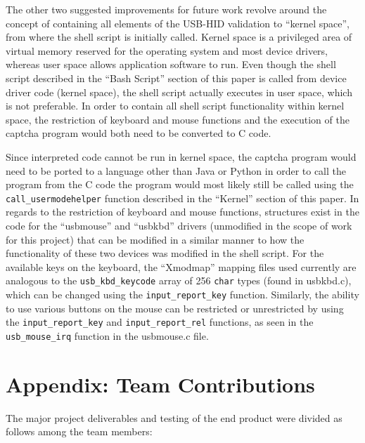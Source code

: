 \documentclass[pagenumbers]{ieee}
\begin{document}
The other two suggested improvements for future work revolve around the concept of containing all elements of the USB-HID validation to ``kernel space'', from where the shell script is initially called. Kernel space is a privileged area of virtual memory reserved for the operating system and most device drivers, whereas user space allows application software to run. Even though the shell script described in the ``Bash Script'' section of this paper is called from device driver code (kernel space), the shell script actually executes in user space, which is not preferable. In order to contain all shell script functionality within kernel space, the restriction of keyboard and mouse functions and the execution of the captcha program would both need to be converted to C code. 

Since interpreted code cannot be run in kernel space, the captcha program would need to be ported to a language other than Java or Python in order to call the program from the C code \textemdash the program would most likely still be called using the \texttt{call\_usermodehelper} function described in the ``Kernel'' section of this paper. In regards to the restriction of keyboard and mouse functions, structures exist in the code for the ``usbmouse'' and ``usbkbd'' drivers (unmodified in the scope of work for this project) that can be modified in a similar manner to how the functionality of these two devices was modified in the shell script. For the available keys on the keyboard, the ``Xmodmap'' mapping files used currently are analogous to the \texttt{usb\_kbd\_keycode} array of 256 \texttt{char} types (found in usbkbd.c), which can be changed using the \texttt{input\_report\_key} function. Similarly, the ability to use various buttons on the mouse can be restricted or unrestricted by using the \texttt{input\_report\_key} and \texttt{input\_report\_rel} functions, as seen in the \texttt{usb\_mouse\_irq} function in the usbmouse.c file.


\appendix 


\section{Appendix: Team Contributions}

The major project deliverables and testing of the end product were divided as follows among the team members:
\end{document}
